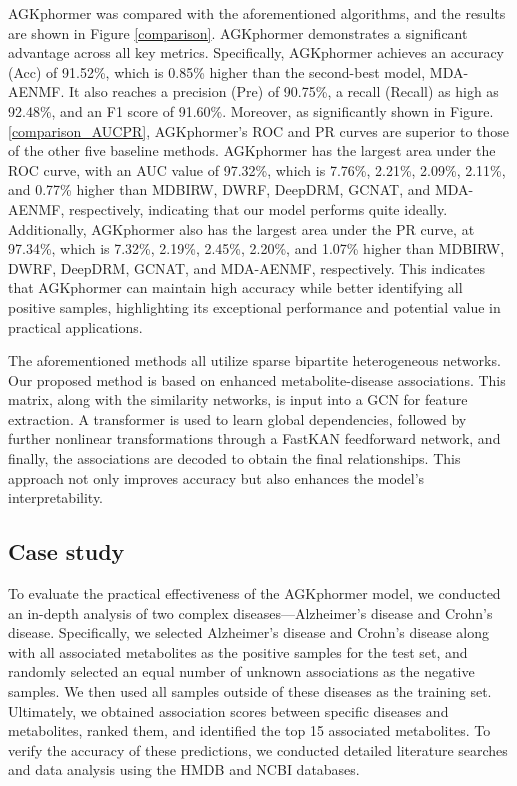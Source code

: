 \documentclass[lettersize,journal]{IEEEtran}
\begin{document}
AGKphormer was compared with the aforementioned algorithms, and the results are shown in Figure \ref{comparison}. AGKphormer demonstrates a significant advantage across all key metrics. Specifically, AGKphormer achieves an accuracy (Acc) of 91.52\%, which is 0.85\% higher than the second-best model, MDA-AENMF. It also reaches a precision (Pre) of 90.75\%, a recall (Recall) as high as 92.48\%, and an F1 score of 91.60\%. Moreover, as significantly shown in Figure.\ref{comparison_AUCPR}, AGKphormer's ROC and PR curves are superior to those of the other five baseline methods. AGKphormer has the largest area under the ROC curve, with an AUC value of 97.32\%, which is 7.76\%, 2.21\%, 2.09\%, 2.11\%, and 0.77\% higher than MDBIRW, DWRF, DeepDRM, GCNAT, and MDA-AENMF, respectively, indicating that our model performs quite ideally. Additionally, AGKphormer also has the largest area under the PR curve, at 97.34\%, which is 7.32\%, 2.19\%, 2.45\%, 2.20\%, and 1.07\% higher than MDBIRW, DWRF, DeepDRM, GCNAT, and MDA-AENMF, respectively. This indicates that AGKphormer can maintain high accuracy while better identifying all positive samples, highlighting its exceptional performance and potential value in practical applications.

The aforementioned methods all utilize sparse bipartite heterogeneous networks. Our proposed method is based on enhanced metabolite-disease associations. This matrix, along with the similarity networks, is input into a GCN for feature extraction. A transformer is used to learn global dependencies, followed by further nonlinear transformations through a FastKAN feedforward network, and finally, the associations are decoded to obtain the final relationships. This approach not only improves accuracy but also enhances the model's interpretability.


\subsection{\textbf{Case study}}
To evaluate the practical effectiveness of the AGKphormer model, we conducted an in-depth analysis of two complex diseases—Alzheimer's disease and Crohn's disease. Specifically, we selected Alzheimer's disease and Crohn's disease along with all associated metabolites as the positive samples for the test set, and randomly selected an equal number of unknown associations as the negative samples. We then used all samples outside of these diseases as the training set. Ultimately, we obtained association scores between specific diseases and metabolites, ranked them, and identified the top 15 associated metabolites. To verify the accuracy of these predictions, we conducted detailed literature searches and data analysis using the HMDB and NCBI databases.
 
\end{document}
